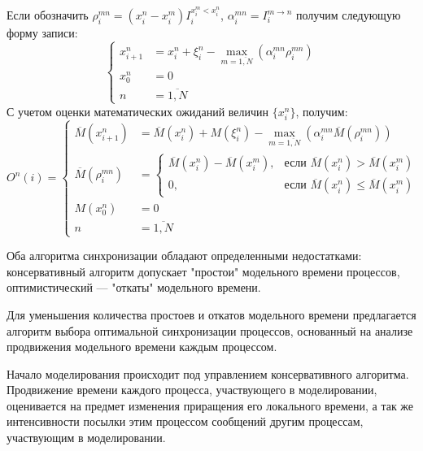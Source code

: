 Если обозначить $\rho_i^{mn}=(x_i^n-x_i^m)I_i^{x_i^m<x_i^n}$, $\alpha_i^{mn}=I_i^{m\rightarrow n}$ получим следующую форму записи:
\begin{equation}
\label{eq:АС с синхронизацией взаимодействий}
\left\{
\begin{aligned}
x_{i+1}^n & = x_i^n + \xi_i^n-\max\limits_{m=\overline{1, N}}(\alpha_i^{mn}\rho_i^{mn})\\
x_0^n & = 0\\
n & = \overline{1, N}
\end{aligned}
\right.
\end{equation}
С учетом оценки математических ожиданий величин $\{x_i^{n}\}$, получим:
\begin{equation}
\label{eq:АС с синхронизацией взаимодействий}
O^n(i)=
\left\{
\begin{aligned}
\overline{M}(x_{i+1}^n) & = \overline{M}(x_i^n) + M(\xi_i^n)-\max\limits_{m=\overline{1, N}}(\alpha_i^{mn}\overline{M}(\rho_i^{mn}))\\
\overline{M}(\rho_i^{mn}) & = \begin{cases}
\overline{M}(x_i^n)-\overline{M}(x_i^m), & \text{если $\overline{M}(x_i^n)>\overline{M}(x_i^m)$} \\
 0, & \text{если $\overline{M}(x_i^n)\leqslant\overline{M}(x_i^m)$}
 \end{cases}\\
M(x_0^n) & = 0\\
n & = \overline{1, N}
\end{aligned}
\right.
\end{equation}

Оба алгоритма синхронизации обладают определенными недостатками: консервативный алгоритм допускает "простои" модельного времени процессов, оптимистический --- "откаты" модельного времени.

Для уменьшения количества простоев и откатов модельного времени предлагается алгоритм выбора оптимальной синхронизации процессов, основанный на анализе продвижения модельного времени каждым процессом.

Начало моделирования происходит под управлением консервативного алгоритма. Продвижение времени каждого процесса, участвующего в моделировании, оценивается на предмет изменения приращения его локального времени, а так же интенсивности посылки этим процессом сообщений другим процессам, участвующим в моделировании.

